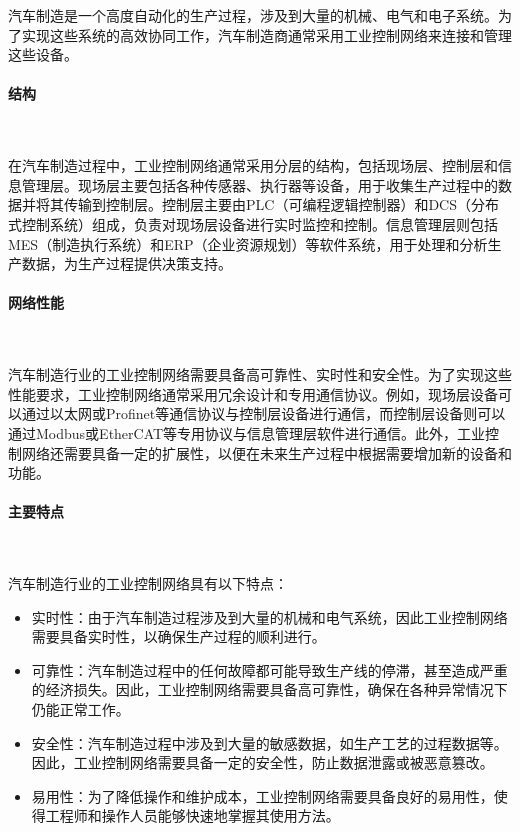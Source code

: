 \documentclass[UTF8]{article}
\begin{document}
汽车制造是一个高度自动化的生产过程，涉及到大量的机械、电气和电子系统。为了实现这些系统的高效协同工作，汽车制造商通常采用工业控制网络来连接和管理这些设备。

\paragraph{结构}~{}

在汽车制造过程中，工业控制网络通常采用分层的结构，包括现场层、控制层和信息管理层。现场层主要包括各种传感器、执行器等设备，用于收集生产过程中的数据并将其传输到控制层。控制层主要由PLC（可编程逻辑控制器）和DCS（分布式控制系统）组成，负责对现场层设备进行实时监控和控制。信息管理层则包括MES（制造执行系统）和ERP（企业资源规划）等软件系统，用于处理和分析生产数据，为生产过程提供决策支持。

\paragraph{网络性能}~{}

汽车制造行业的工业控制网络需要具备高可靠性、实时性和安全性。为了实现这些性能要求，工业控制网络通常采用冗余设计和专用通信协议。例如，现场层设备可以通过以太网或Profinet等通信协议与控制层设备进行通信，而控制层设备则可以通过Modbus或EtherCAT等专用协议与信息管理层软件进行通信。此外，工业控制网络还需要具备一定的扩展性，以便在未来生产过程中根据需要增加新的设备和功能。

\paragraph{主要特点}~{}

汽车制造行业的工业控制网络具有以下特点：

\begin{itemize}
	\item 实时性：由于汽车制造过程涉及到大量的机械和电气系统，因此工业控制网络需要具备实时性，以确保生产过程的顺利进行。
	\item 可靠性：汽车制造过程中的任何故障都可能导致生产线的停滞，甚至造成严重的经济损失。因此，工业控制网络需要具备高可靠性，确保在各种异常情况下仍能正常工作。
	\item 安全性：汽车制造过程中涉及到大量的敏感数据，如生产工艺的过程数据等。因此，工业控制网络需要具备一定的安全性，防止数据泄露或被恶意篡改。
	\item 易用性：为了降低操作和维护成本，工业控制网络需要具备良好的易用性，使得工程师和操作人员能够快速地掌握其使用方法。
\end{itemize}
\end{document}
